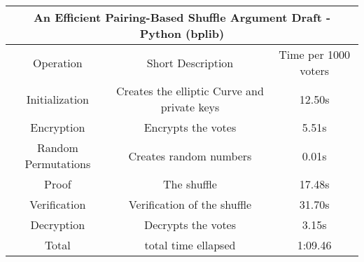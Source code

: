 \documentclass{standalone}
\begin{document}
\begin{tabular}{ |c|c|c|  }
    \hline
    \multicolumn{3}{|c|}{An Efficient Pairing-Based Shuffle Argument Draft -
    Python (bplib)}\\
    \hline
    Operation & Short Description & Time per 1000 voters\\
    \hline
    Initialization & Creates the elliptic Curve and private keys & 12.50s\\
    Encryption & Encrypts the votes & 5.51s\\
    Random Permutations & Creates random numbers & 0.01s\\
    Proof & The shuffle & 17.48s\\
    Verification & Verification of the shuffle & 31.70s\\
    Decryption & Decrypts the votes & 3.15s\\
    Total & total time ellapsed & 1:09.46\\
    \hline
\end{tabular}
\end{document}
